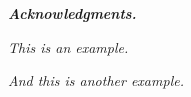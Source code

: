 \hfill{\itshape \textbf{Acknowledgments.}}
\vspace{1.2cm}

\hfill{\itshape This is an example.}
\vspace{1cm}

\hfill{\itshape And this is another example.}
\vspace{1cm}